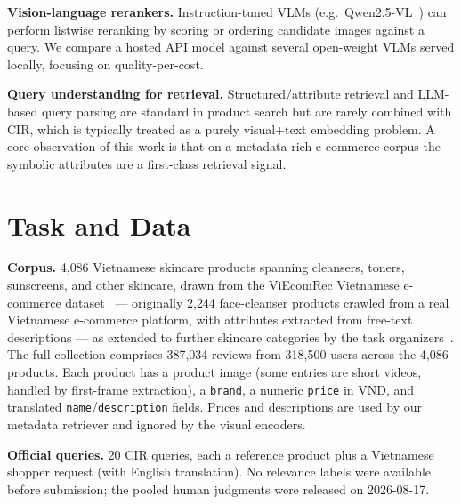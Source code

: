 \documentclass[sigconf,nonacm]{acmart}
\begin{document}
\textbf{Vision-language rerankers.} Instruction-tuned VLMs
(e.g.\ Qwen2.5-VL~\cite{qwenvl}) can perform listwise reranking by scoring or
ordering candidate images against a query. We compare a hosted API model
against several open-weight VLMs served locally, focusing on
quality-per-cost.

\textbf{Query understanding for retrieval.} Structured/attribute retrieval
and LLM-based query parsing are standard in product search but are rarely
combined with CIR, which is typically treated as a purely visual+text
embedding problem. A core observation of this work is that on a metadata-rich
e-commerce corpus the symbolic attributes are a first-class retrieval signal.

\section{Task and Data}
\label{sec:data}
\textbf{Corpus.} 4{,}086 Vietnamese skincare products spanning cleansers,
toners, sunscreens, and other skincare, drawn from the ViEcomRec Vietnamese
e-commerce dataset~\cite{viecomrec} --- originally 2{,}244 face-cleanser
products crawled from a real Vietnamese e-commerce platform, with attributes
extracted from free-text descriptions --- as extended to further skincare
categories by the task organizers~\cite{cameo}. The full collection comprises
387{,}034 reviews from 318{,}500 users across the 4{,}086 products. Each
product has a product image (some entries are short videos, handled by
first-frame extraction), a \texttt{brand}, a numeric \texttt{price} in VND, and
translated \texttt{name}/\texttt{description} fields. Prices and descriptions
are used by our metadata retriever and ignored by the visual encoders.

\textbf{Official queries.} 20 CIR queries, each a reference product plus a
Vietnamese shopper request (with English translation). No relevance labels
were available before submission; the pooled human judgments were released on
2026-08-17.
\end{document}
